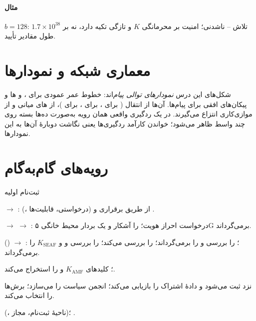 \documentclass[11pt,a4paper]{article}
\begin{document}
\paragraph{مثال} $b = 128$: $1.7\times10^{38}$ تلاش -- ناشدنی؛ امنیت  بر محرمانگی $K$ و تازگی  تکیه دارد، نه بر طول
مقادیر تأیید.

\section{معماری شبکه و نمودارها}
شکل‌های این درس \emph{نمودارهای توالی پیام}‌اند: خطوط عمر عمودی برای ،  و ها و پیکان‌های افقی برای
پیام‌ها. آن‌ها از انتقال ( برای ،  برای ،  برای )، از های میانی
و از موازی‌کاری انتزاع می‌گیرند. در یک ردگیری واقعی همان رویه به‌صورت ده‌ها بسته روی چند واسط ظاهر می‌شود؛ خواندن کارآمد ردگیری‌ها
یعنی نگاشت دوبارهٔ آن‌ها به این نمودارها.

\section{رویه‌های گام‌به‌گام}

\begin{procedurebox}{ثبت‌نام اولیه}\label{proc:reg}
\begin{steps}
  \item {} $\to$ :  (،  درخواستی، قابلیت‌ها) از طریق برقراری
         و .
  \item {} $\to$  $\to$ : درخواست احراز هویت؛   را آشکار و یک بردار محیط خانگی ۵G
        برمی‌گرداند.
  \item {} () $\to$ : ؛   را بررسی و  را برمی‌گرداند؛
          را بررسی می‌کند؛   را بررسی و  و $K_{\mathrm{SEAF}}$ را برمی‌گرداند.
  \item {}؛  کلیدهای $K_{\mathrm{AMF}}$ و  را استخراج می‌کند.
  \item {} نزد  ثبت می‌شود و دادهٔ اشتراک را بازیابی می‌کند؛ انجمن سیاست  را می‌سازد؛ برش‌ها را انتخاب
        می‌کند.
  \item {} (، ناحیهٔ ثبت‌نام،  مجاز)؛ .
\end{steps}
\end{procedurebox}
\end{document}
